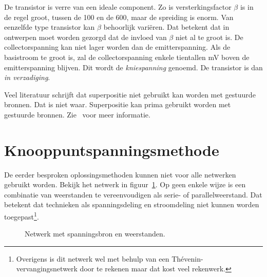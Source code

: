 \begin{example}
De transistor is verre van een ideale component. Zo is versterkingsfactor $\beta$ is in de regel groot, tussen de 100 en de 600, maar de spreiding is enorm. Van eenzelfde type transistor kan $\beta$ behoorlijk variëren. Dat betekent dat in ontwerpen moet worden gezorgd dat de invloed van $\beta$ niet al te groot is. De collectorspanning kan niet lager worden dan de emitterspanning. Als de basistroom te groot is, zal de collectorspanning enkele tientallen \si{\milli\volt} boven de emitterspanning blijven. Dit wordt de \textsl{kniespanning} genoemd. De transistor is dan \textsl{in verzadiging}.
\end{example}


Veel literatuur schrijft dat superpositie niet gebruikt kan worden met gestuurde bronnen. Dat is niet waar. Superpositie kan prima gebruikt worden met gestuurde bronnen. Zie~\cite{leachapplication} voor meer informatie.


\fi

\iftrue


\section{Knooppuntspanningsmethode}
De eerder besproken oplossingsmethoden kunnen niet voor alle netwerken gebruikt worden. Bekijk het netwerk in figuur~\ref{fig:gelnetwerkvoornodalanalysis}. Op geen enkele wijze is een combinatie van weerstanden te vereenvoudigen als serie- of parallelweerstand. Dat betekent dat technieken als spanningsdeling en stroomdeling niet kunnen worden toegepast\footnote{Overigens is dit netwerk wel met behulp van een Thévenin-vervangingsnetwerk door te rekenen maar dat kost veel rekenwerk.}.

\begin{figure}[!ht]
\centering
{}
\caption{Netwerk met spanningsbron en weerstanden.}
\label{fig:gelnetwerkvoornodalanalysis}
\end{figure}

